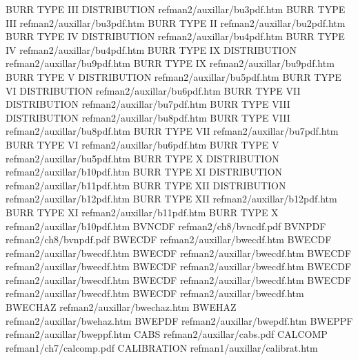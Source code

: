 BURR TYPE III DISTRIBUTION              refman2/auxillar/bu3pdf.htm
BURR TYPE III                           refman2/auxillar/bu3pdf.htm
BURR TYPE II                            refman2/auxillar/bu2pdf.htm
BURR TYPE IV DISTRIBUTION               refman2/auxillar/bu4pdf.htm
BURR TYPE IV                            refman2/auxillar/bu4pdf.htm
BURR TYPE IX DISTRIBUTION               refman2/auxillar/bu9pdf.htm
BURR TYPE IX                            refman2/auxillar/bu9pdf.htm
BURR TYPE V DISTRIBUTION                refman2/auxillar/bu5pdf.htm
BURR TYPE VI DISTRIBUTION               refman2/auxillar/bu6pdf.htm
BURR TYPE VII DISTRIBUTION              refman2/auxillar/bu7pdf.htm
BURR TYPE VIII DISTRIBUTION             refman2/auxillar/bu8pdf.htm
BURR TYPE VIII                          refman2/auxillar/bu8pdf.htm
BURR TYPE VII                           refman2/auxillar/bu7pdf.htm
BURR TYPE VI                            refman2/auxillar/bu6pdf.htm
BURR TYPE V                             refman2/auxillar/bu5pdf.htm
BURR TYPE X DISTRIBUTION                refman2/auxillar/b10pdf.htm
BURR TYPE XI DISTRIBUTION               refman2/auxillar/b11pdf.htm
BURR TYPE XII DISTRIBUTION              refman2/auxillar/b12pdf.htm
BURR TYPE XII                           refman2/auxillar/b12pdf.htm
BURR TYPE XI                            refman2/auxillar/b11pdf.htm
BURR TYPE X                             refman2/auxillar/b10pdf.htm
BVNCDF                                  refman2/ch8/bvncdf.pdf
BVNPDF                                  refman2/ch8/bvnpdf.pdf
BWECDF                                  refman2/auxillar/bwecdf.htm
BWECDF                                  refman2/auxillar/bwecdf.htm
BWECDF                                  refman2/auxillar/bwecdf.htm
BWECDF                                  refman2/auxillar/bwecdf.htm
BWECDF                                  refman2/auxillar/bwecdf.htm
BWECDF                                  refman2/auxillar/bwecdf.htm
BWECDF                                  refman2/auxillar/bwecdf.htm
BWECDF                                  refman2/auxillar/bwecdf.htm
BWECDF                                  refman2/auxillar/bwecdf.htm
BWECHAZ                                 refman2/auxillar/bwechaz.htm
BWEHAZ                                  refman2/auxillar/bwehaz.htm
BWEPDF                                  refman2/auxillar/bwepdf.htm
BWEPPF                                  refman2/auxillar/bweppf.htm
CABS                                    refman2/auxillar/cabs.pdf
CALCOMP                                 refman1/ch7/calcomp.pdf
CALIBRATION                             refman1/auxillar/calibrat.htm
